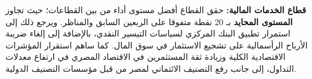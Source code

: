 \textbf{قطاع الخدمات المالية:} حقق القطاع أفضل مستوى أداء من بين القطاعات؛ حيث تجاوز \textbf{المستوى المحايد} بـ 20 نقطة متفوقا على الربعين السابق والمناظر. ويرجع ذلك إلى استمرار تطبيق البنك المركزي لسياسات التيسير النقدي، بالإضافة إلى إلغاء ضريبة الأرباح الرأسمالية على تشجيع الاستثمار في سوق المال. كما ساهم استقرار المؤشرات الاقتصادية الكلية وزيادة ثقة المستثمرين في الاقتصاد المصري في ارتفاع معدلات التداول، إلى جانب رفع التصنيف الائتماني لمصر من قبل مؤسسات التصنيف الدولية.
